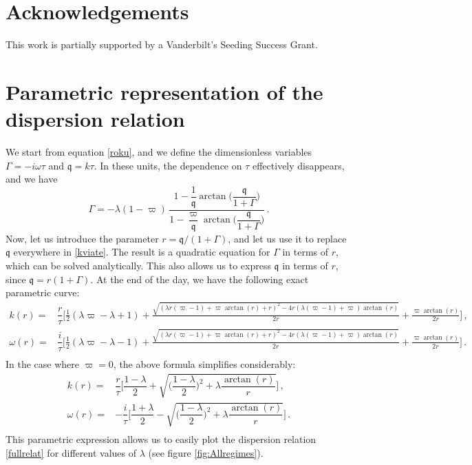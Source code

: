 \documentclass[a4paper, amsfonts, amssymb, amsmath, reprint, showkeys, nofootinbib, twoside,notitlepage,onecolumn]{revtex4-2}
\newcommand{\q}{{\mathfrak{q}}}
\theoremstyle{definition}
\theoremstyle{theorem}
\theoremstyle{corollary}
\begin{document}
\newpage
\section*{Acknowledgements}

This work is partially supported by a Vanderbilt's Seeding Success Grant.


\appendix



\section{Parametric representation of the dispersion relation}\label{parametrizzone}



We start from equation \eqref{roku}, and we define the dimensionless variables
$\Gamma=-i\omega\tau$ and $\q=k\tau$. In these units, the dependence on $\tau$ effectively disappears, and we have
\begin{equation}\label{kviate}
\Gamma= -\lambda  (1{-}\varpi) \, \dfrac{1-\dfrac{1}{\q}\arctan\bigg(\dfrac{\q}{1{+}\Gamma}\bigg)}{1-\dfrac{\varpi}{\q}\arctan\bigg(\dfrac{\q}{1{+}\Gamma}\bigg)}  \, .
\end{equation}
Now, let us introduce the parameter $r=\q/(1+\Gamma)$, and let us use it to replace $\q$ everywhere in \eqref{kviate}. The result is a quadratic equation for $\Gamma$ in terms of $r$, which can be solved analytically. This also allows us to express $\q$ in terms of $r$, since $\q=r(1+\Gamma)$. At the end of the day, we have the following exact parametric curve:
\begin{equation}
\begin{split}
k(r)={}&\dfrac{r}{\tau} \bigg[\frac{1}{2}  (\lambda  \varpi -\lambda +1)+\frac{\sqrt{\left(\lambda  r (\varpi -1)+\varpi  \arctan(r)+r\right)^2-4 r (\lambda  (\varpi -1)+\varpi ) \arctan (r)}}{2r}+\frac{\varpi  \arctan(r)}{2r} \bigg] \, , \\
\omega(r)={}&\dfrac{i}{\tau} \bigg[ \frac{1}{2} (\lambda  \varpi -\lambda -1)+\frac{\sqrt{\left(\lambda  r (\varpi -1)+\varpi  \arctan (r)+r\right)^2-4 r (\lambda  (\varpi -1)+\varpi ) \arctan(r)}}{2 r}+\frac{\varpi  \arctan (r)}{2 r} \bigg] \, . \\
\end{split}
\end{equation}
In the case where $\varpi=0$, the above formula simplifies considerably:
\begin{equation}\label{koM}
\begin{split}
k(r)={}& \dfrac{r}{\tau} \bigg[ \dfrac{1{-}\lambda}{2} +\sqrt{\bigg(\dfrac{1{-}\lambda}{2} \bigg)^2 +\lambda \dfrac{\arctan(r)}{r}} \bigg] \, , \\
\omega(r)={}& -\dfrac{i}{\tau}  \bigg[ \dfrac{1{+}\lambda}{2} -\sqrt{\bigg(\dfrac{1{-}\lambda}{2} \bigg)^2 +\lambda \dfrac{\arctan(r)}{r}} \bigg] \, . \\
\end{split}
\end{equation}
This parametric expression allows us to easily plot the dispersion relation \eqref{fullrelat} for different values of $\lambda$ (see figure \ref{fig:Allregimes}).
\end{document}
